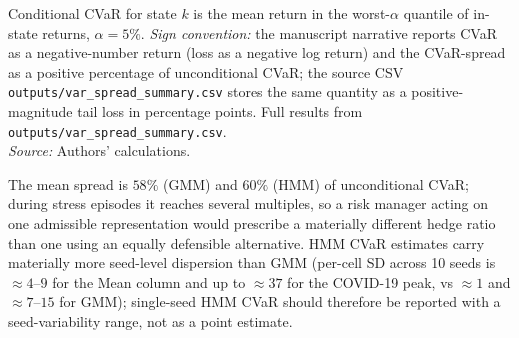 \documentclass[preprint,12pt,authoryear]{elsarticle}
\begin{document}
\begin{table}[!htbp]
{Conditional CVaR for state $k$ is the mean return in the worst-$\alpha$ quantile of in-state returns, $\alpha=5\%$.
\emph{Sign convention:} the manuscript narrative reports CVaR as a negative-number return (loss as a negative log return) and the CVaR-spread as a positive percentage of unconditional CVaR; the source CSV \texttt{outputs/var\_spread\_summary.csv} stores the same quantity as a positive-magnitude tail loss in percentage points.
Full results from \texttt{outputs/var\_spread\_summary.csv}.\\
\textit{Source:} Authors' calculations.}
\end{table}

The mean spread is $58\%$ (GMM) and $60\%$ (HMM) of unconditional CVaR; during stress episodes it reaches several multiples, so a risk manager acting on one admissible representation would prescribe a materially different hedge ratio than one using an equally defensible alternative. HMM CVaR estimates carry materially more seed-level dispersion than GMM (per-cell SD across 10 seeds is $\approx 4$--$9$ for the Mean column and up to $\approx 37$ for the COVID-19 peak, vs $\approx 1$ and $\approx 7$--$15$ for GMM); single-seed HMM CVaR should therefore be reported with a seed-variability range, not as a point estimate.
\end{document}
